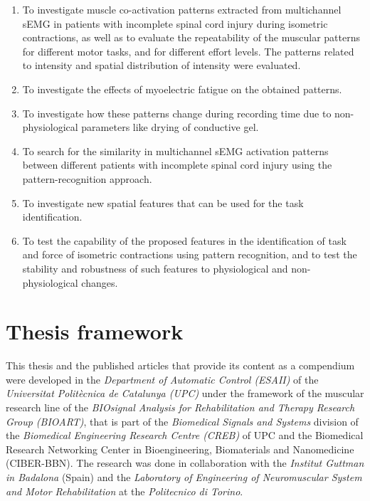 \begin{enumerate}[I]

\item To investigate muscle co-activation patterns extracted from multichannel sEMG in patients with incomplete spinal cord injury during isometric contractions, as well as to evaluate the repeatability of the muscular patterns for different motor tasks, and for different effort levels. The patterns related to intensity and spatial distribution of intensity were evaluated.

\item To investigate the effects of myoelectric fatigue on the obtained patterns.

\item To investigate how these patterns change during recording time due to non-physiological parameters like drying of conductive gel.

\item To search for the similarity in multichannel sEMG activation patterns between different patients with incomplete spinal cord injury using the pattern-recognition approach.

\item To investigate new spatial features that can be used for the task identification.

\item To test the capability of the proposed features in the identification of task and force of isometric contractions using pattern recognition, and to test the stability and robustness of such features to physiological and non-physiological changes.


\end{enumerate}

     \section{Thesis framework}
     
This thesis and the published articles that provide its content as a compendium were developed in the \emph{Department of Automatic Control (ESAII)} of the \emph{Universitat Polit\`{e}cnica de Catalunya (UPC)} under the framework of the muscular research line of the \emph{BIOsignal Analysis for Rehabilitation and Therapy Research Group (BIOART)}, that is part of the \emph{Biomedical Signals and Systems} division of the \emph{Biomedical Engineering Research Centre (CREB)} of UPC and the Biomedical Research Networking Center in Bioengineering, Biomaterials and Nanomedicine (CIBER-BBN). The research was done in collaboration with the \emph{Institut Guttman in Badalona} (Spain) and the \emph{Laboratory of Engineering of Neuromuscular System and Motor Rehabilitation} at the \emph{Politecnico di Torino}.

